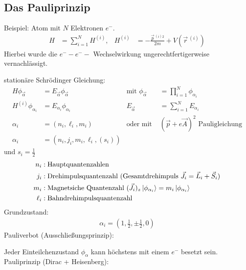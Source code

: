 \subsection{Das Pauliprinzip}
Beispiel: Atom mit $N$ Elektronen $e^-$.
	\begin{align*}
		H &= \sum_{i=1}^N H^{(i)} ,& 
		H^{(i)} &= - \frac{\vec{p}\,^{(i)2}}{2m} + V(\vec{r}\,^{(i)}) 
	\end{align*}
Hierbei wurde die $e^- -e^- -$ Wechselwirkung ungerechtfertigerweise vernachlässigt.
	
stationäre Schrödinger Gleichung:
	\begin{align*}
		H \phi_{\vec{\alpha}} &= E_{\vec{\alpha}} \phi_{\vec{\alpha}} 
		&\text{mit } \phi_{\vec{\alpha}} &= \prod_{i=1}^N \phi_{\alpha_i} \\
		H^{(i)} \phi_{\alpha_i} &= E_{\alpha_i} \phi_{\alpha_i} 
		&E_{\vec{\alpha}} &= \sum_{i=1}^N E_{\alpha_i} \\
		\alpha_i &= (n_i, \ell_i , m_i) 
		&\text{oder mit } &(\vec{p}+e \vec{A})^2 
		\text{ Pauligleichung} \\
		\alpha_i &= (n_i, j_i, m_i , \ell_i ,(s_i))
	\end{align*}
und $s_i = \frac{1}{2}$
	\begin{align*}
		n_i &: \text{Hauptquantenzahlen} \\
		j_i &: \text{Drehimpulsquantenzahl } ( \text{Gesamtdrehimpuls } \vec{J}_i = \vec{L}_i + \vec{S}_i) \\
		m_i &: \text{Magnetsiche Quantenzahl } (\vec{J}_i)_z \ket{\phi_{\alpha_i}} = m_i \ket{\phi_{\alpha_i}} \\
		\ell_i &: \text{Bahndrehimpulsquantenzahl}
	\end{align*}
Grundzustand:
	\begin{align*}
		\alpha_i = (1, \frac{1}{2}, \pm \frac{1}{2}, 0)
	\end{align*}
Pauliverbot (Ausschließungsprinzip):
		
Jeder Einteilchenzustand $\phi_\alpha$ kann höchstens mit einem $e^-$ besetzt sein. \\
Pauliprinzip (Dirac + Heisenberg):
		
